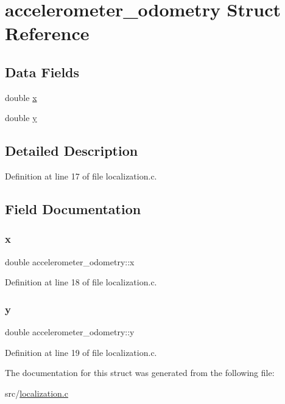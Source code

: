 \hypertarget{structaccelerometer__odometry}{}\section{accelerometer\+\_\+odometry Struct Reference}
\label{structaccelerometer__odometry}
\subsection*{Data Fields}
\begin{DoxyCompactItemize}
\item 
double \hyperlink{structaccelerometer__odometry_a83af671d99413a7c480678d5abb9c64a}{x}
\item 
double \hyperlink{structaccelerometer__odometry_a4d812f516efdd477ae9f74fca2a07a2b}{y}
\end{DoxyCompactItemize}


\subsection{Detailed Description}


Definition at line 17 of file localization.\+c.



\subsection{Field Documentation}
\mbox{\label{structaccelerometer__odometry_a83af671d99413a7c480678d5abb9c64a}} 
\subsubsection{\texorpdfstring{x}{x}}
{\footnotesize\ttfamily double accelerometer\+\_\+odometry\+::x}



Definition at line 18 of file localization.\+c.

\mbox{\label{structaccelerometer__odometry_a4d812f516efdd477ae9f74fca2a07a2b}} 
\subsubsection{\texorpdfstring{y}{y}}
{\footnotesize\ttfamily double accelerometer\+\_\+odometry\+::y}



Definition at line 19 of file localization.\+c.



The documentation for this struct was generated from the following file\+:\begin{DoxyCompactItemize}
\item 
src/\hyperlink{localization_8c}{localization.\+c}\end{DoxyCompactItemize}
